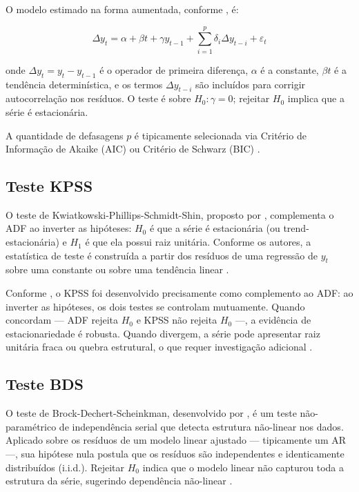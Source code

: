 \documentclass[
  12pt,
  openright,
  twoside,
  a4paper,
  english,
  brazil
]{abntex2}
\begin{document}
O modelo estimado na forma aumentada, conforme , é:

\begin{equation}
  \Delta y_t = \alpha + \beta t + \gamma y_{t-1} + \sum_{i=1}^{p} \delta_i \Delta y_{t-i} + \varepsilon_t
  \label{eq:adf}
\end{equation}

onde $\Delta y_t = y_t - y_{t-1}$ é o operador de primeira diferença, $\alpha$ é a constante, $\beta t$ é a tendência determinística, e os termos $\Delta y_{t-i}$ são incluídos para corrigir autocorrelação nos resíduos. O teste é sobre $H_0: \gamma = 0$; rejeitar $H_0$ implica que a série é estacionária.

A quantidade de defasagens $p$ é tipicamente selecionada via Critério de Informação de Akaike (AIC) ou Critério de Schwarz (BIC) \cite{said1984testing}.

\subsection{Teste KPSS}
\label{subsec:kpss}

O teste de Kwiatkowski-Phillips-Schmidt-Shin, proposto por , complementa o ADF ao inverter as hipóteses: $H_0$ é que a série é estacionária (ou trend-estacionária) e $H_1$ é que ela possui raiz unitária. Conforme os autores, a estatística de teste é construída a partir dos resíduos de uma regressão de $y_t$ sobre uma constante ou sobre uma tendência linear \cite{kwiatkowski1992testing}.

Conforme , o KPSS foi desenvolvido precisamente como complemento ao ADF: ao inverter as hipóteses, os dois testes se controlam mutuamente. Quando concordam — ADF rejeita $H_0$ e KPSS não rejeita $H_0$ —, a evidência de estacionariedade é robusta. Quando divergem, a série pode apresentar raiz unitária fraca ou quebra estrutural, o que requer investigação adicional \cite{kwiatkowski1992testing}.

\subsection{Teste BDS}
\label{subsec:bds}

O teste de Brock-Dechert-Scheinkman, desenvolvido por , é um teste não-paramétrico de independência serial que detecta estrutura não-linear nos dados. Aplicado sobre os resíduos de um modelo linear ajustado — tipicamente um AR —, sua hipótese nula postula que os resíduos são independentes e identicamente distribuídos (i.i.d.). Rejeitar $H_0$ indica que o modelo linear não capturou toda a estrutura da série, sugerindo dependência não-linear \cite{broock1996test}.
\end{document}

